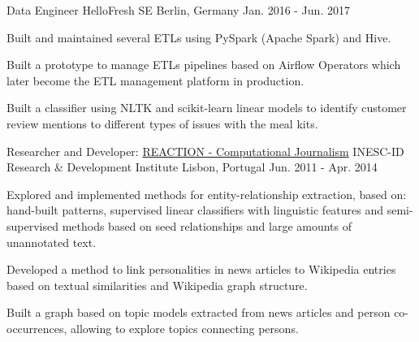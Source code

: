 \begin{cventries}
  \cventry
    {Data Engineer} %
    {HelloFresh SE} %
    {Berlin, Germany} %
    {Jan. 2016 - Jun. 2017} %
    {
      \begin{cvitems} %
        \item {Built and maintained several ETLs using PySpark (Apache Spark) and Hive.}
        \item {Built a prototype to manage ETLs pipelines based on Airflow Operators which later become the ETL management platform in production.}
        \item {Built a classifier using NLTK and scikit-learn linear models to identify customer review mentions to different types of issues with the meal kits.}
      \end{cvitems}
    }
	
  \cventry
    {Researcher and Developer: \href{http://arquivo.pt/wayback/20151118124735/http://dmir.inesc-id.pt/project/Reaction}{REACTION - Computational Journalism}} %
    {INESC-ID Research \& Development Institute} %
    {Lisbon, Portugal} %
    {Jun. 2011 - Apr. 2014} %
    {
      \begin{cvitems} %
        \item {Explored and implemented methods for entity-relationship extraction, based on: hand-built patterns, supervised linear classifiers with linguistic features and semi-supervised methods based on seed relationships and large amounts of unannotated text.}
        \item {Developed a method to link personalities in news articles to Wikipedia entries based on textual similarities and Wikipedia graph structure.}
        \item {Built a graph based on topic models extracted from news articles and person co-occurrences, allowing to explore topics connecting persons.}
      \end{cvitems}
    }



\end{cventries}
